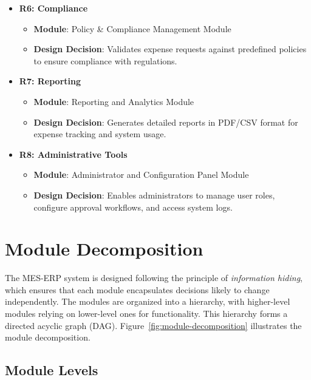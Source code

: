 \documentclass[12pt, titlepage]{article}
\begin{document}
\begin{itemize}
    \item \textbf{R6: Compliance}
    \begin{itemize}
        \item \textbf{Module}: Policy \& Compliance Management Module
        \item \textbf{Design Decision}: Validates expense requests against predefined policies to ensure compliance with regulations.
    \end{itemize}
    
    \item \textbf{R7: Reporting}
    \begin{itemize}
        \item \textbf{Module}: Reporting and Analytics Module
        \item \textbf{Design Decision}: Generates detailed reports in PDF/CSV format for expense tracking and system usage.
    \end{itemize}
    
    \item \textbf{R8: Administrative Tools}
    \begin{itemize}
        \item \textbf{Module}: Administrator and Configuration Panel Module
        \item \textbf{Design Decision}: Enables administrators to manage user roles, configure approval workflows, and access system logs.
    \end{itemize}
\end{itemize}

\section{Module Decomposition}

The MES-ERP system is designed following the principle of \textit{information hiding}, which ensures that each module encapsulates decisions likely to change independently. The modules are organized into a hierarchy, with higher-level modules relying on lower-level ones for functionality. This hierarchy forms a directed acyclic graph (DAG). Figure~\ref{fig:module-decomposition} illustrates the module decomposition.

\subsection{Module Levels}
\end{document}
